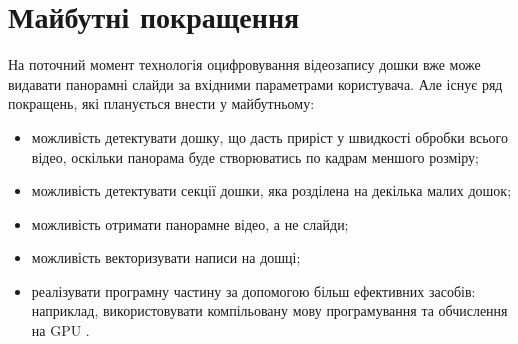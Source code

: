 \section{Майбутні покращення}

На поточний момент технологія оцифровування відеозапису дошки вже може
видавати панорамні слайди за вхідними параметрами користувача. Але існує
ряд покращень, які планується внести у майбутньому:

\begin{itemize}
    \item можливість детектувати дошку, що дасть приріст у швидкості обробки
          всього відео, оскільки панорама буде створюватись по кадрам меншого розміру;
    \item можливість детектувати секції дошки, яка розділена на декілька малих дошок;
    \item можливість отримати панорамне відео, а не слайди;
    \item можливість векторизувати написи на дошці;
    \item реалізувати програмну частину за допомогою більш ефективних засобів:
      наприклад, використовувати компільовану мову програмування
      та обчислення на GPU \cite{bib:cuda,bib:opencl}.
\end{itemize}

\clearpage
